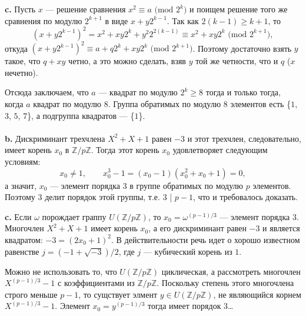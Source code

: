 \documentclass{mai_book}
\begin{document}
\textbf{c. } Пусть $x$ --- решение сравнения $x^{2} \equiv a \text{ (mod } 2^{k})$ и поищем решение того же сравнения по модулю $2^{k+1}$ в виде $x+y2^{k-1}$. Так как $2(k-1) \ge k+1$, то
\begin{equation*}
	(x+y2^{k-1})^{2} = x^{2}+ xy2^{k} + y^{2}2^{2(k-1)} \equiv x^{2} + xy2^{k} \text{ (mod } 2^{k+1}),
\end{equation*}
откуда $(x+y2^{k-1})^{2} \equiv a + q2^{k} + xy2^{k} \text{ (mod } 2^{k+1})$. Поэтому достаточно взять $y$ такое, что $q + xy$ четно, а это можно сделать, взяв $y$ той же четности, что и $q$ ($x$ нечетно). \par
Отсюда заключаем, что $a$ --- квадрат по модулю $2^{k} \ge 8$ тогда и только тогда, когда $a$ квадрат по модулю $8$. Группа обратимых по модулю $8$ элементов есть \{$1$, $3$, $5$, $7$\}, а подгруппа квадратов --- \{$1$\}. \\

 \\

\textbf{b. } Дискриминант трехчлена $X^{2} + X + 1$ равен $-3$ и этот трехчлен, следовательно, имеет корень $x_{0}$ в $\mathbb{Z}/p\mathbb{Z}$. Тогда этот корень $x_{0}$ удовлетворяет следующим условиям:
\begin{equation*}
	x_{0} \neq 1, \qquad x_{0}^{3} - 1 = (x_{0} - 1)(x_{0}^{2}+x_{0}+1) = 0,
\end{equation*}
а значит, $x_{0}$ --- элемент порядка $3$ в группе обратимых по модулю $p$ элементов. Поэтому $3$ делит порядок этой группы, т.е. $3$ | $p - 1$, что и требовалось доказать. \smallskip

\textbf{c. } Если $\omega$ порождает граппу $U(\mathbb{Z}/p\mathbb{Z})$, то $x_{0} = \omega^{(p-1)/3}$ --- элемент порядка $3$. Многочлен $X^{2} + X + 1$ имеет корень $x_{0}$, а его дискриминант равен $-3$ и является квадратом: $-3 = (2x_{0}+1)^{2}$. В действительности речь идет о хорошо известном равенстве $j = (-1+\sqrt{-3})/2$, где $j$ --- кубический корень из $1$. \par
Можно не использовать то, что $U(\mathbb{Z}/p\mathbb{Z})$ циклическая, а рассмотреть многочлен $X^{(p-1)/3} - 1$ с коэффициентами из $\mathbb{Z}/p\mathbb{Z}$. Поскольку степень этого многочлена строго меньше $p - 1$, то сущствует элмент $y \in U(\mathbb{Z}/p\mathbb{Z})$, не являющийся корнем $X^{(p-1)/3} - 1$. Элемент $x_{0} = y^{(p-1)/3}$ тогда имеет порядок 3\ldots  \\

 \\
\end{document}
